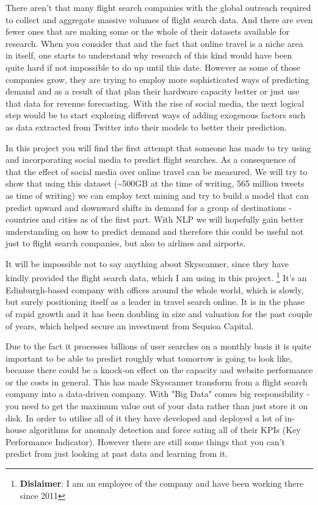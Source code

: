 \documentclass[minf,frontabs,twoside,singlespacing,parskip]{infthesis}
\begin{document}
There aren't that many flight search companies with the global outreach required to collect and aggregate massive volumes of flight search data. And there are even fewer ones that are making some or the whole of their datasets available for research. When you consider that and the fact that online travel is a niche area in itself, one starts to understand why research of this kind would have been quite hard if not impossible to do up until this date. However as some of those companies grow, they are trying to employ more sophisticated ways of predicting demand and as a result of that plan their hardware capacity better or just use that data for revenue forecasting. With the rise of social media, the next logical step would be to start exploring different ways of adding exogenous factors such as data extracted from Twitter into their models to better their prediction. 


In this project you will find the first attempt that someone has made to try using and incorporating social media to predict flight searches. As a consequence of that the effect of social media over online travel can be measured. We will try to show that using this dataset (\textasciitilde 500GB at the time of writing, 565 million tweets as time of writing) we can employ text mining and try to build a model that can predict upward and downward shifts in demand for a group of destinations - countries and cities as of the first part. With NLP we will hopefully gain better understanding on how to predict demand and therefore this could be useful not just to flight search companies, but also to airlines and airports. 


It will be impossible not to say anything about Skyscanner, since they have kindly provided the flight search data, which I am using in this project. \footnote{\textbf{Dislaimer}: I am an employee of the company and have been working there since 2011} It's an Edinburgh-based company with offices around the whole world, which is slowly, but surely positioning itself as a leader in travel search online. It is in the phase of rapid growth and it has been doubling in size and valuation for the past couple of years, which helped secure an investment from Sequioa Capital. \cite{seqcap}


Due to the fact it processes billions of user searches on a monthly basis it is quite important to be able to predict roughly what tomorrow is going to look like, because there could be a knock-on effect on the capacity and website performance or the costs in general. This has made Skyscanner transform from a flight search company into a data-driven company. With "Big Data" comes big responsibility - you need to get the maximum value out of your data rather than just store it on disk. In order to utilise all of it they have developed and deployed a lot of in-house algorithms for anomaly detection and force sating all of their KPIs (Key Performance Indicator). However there are still some things that you can't predict from just looking at past data and learning from it.
\end{document}
